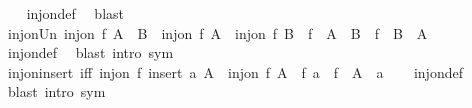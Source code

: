 \begin{isabellebody}
%
\isadelimproof
\ \ %
\endisadelimproof
%
\isatagproof
{}\isamarkupfalse%
\ inj{\isacharunderscore}{\kern0pt}on{\isacharunderscore}{\kern0pt}def\ \isamarkupfalse%
\ blast%
\endisatagproof
{\isafoldproof}%
%
\isadelimproof
\isanewline
%
\endisadelimproof
\isanewline
{}\isamarkupfalse%
\ inj{\isacharunderscore}{\kern0pt}on{\isacharunderscore}{\kern0pt}Un{\isacharcolon}{\kern0pt}\ {\isachardoublequoteopen}inj{\isacharunderscore}{\kern0pt}on\ f\ {\isacharparenleft}{\kern0pt}A\ {\isasymunion}\ B{\isacharparenright}{\kern0pt}\ {\isasymlongleftrightarrow}\ inj{\isacharunderscore}{\kern0pt}on\ f\ A\ {\isasymand}\ inj{\isacharunderscore}{\kern0pt}on\ f\ B\ {\isasymand}\ f\ {\isacharbackquote}{\kern0pt}\ {\isacharparenleft}{\kern0pt}A\ {\isacharminus}{\kern0pt}\ B{\isacharparenright}{\kern0pt}\ {\isasyminter}\ f\ {\isacharbackquote}{\kern0pt}\ {\isacharparenleft}{\kern0pt}B\ {\isacharminus}{\kern0pt}\ A{\isacharparenright}{\kern0pt}\ {\isacharequal}{\kern0pt}\ {\isacharbraceleft}{\kern0pt}{\isacharbraceright}{\kern0pt}{\isachardoublequoteclose}\isanewline
%
\isadelimproof
\ \ %
\endisadelimproof
%
\isatagproof
{}\isamarkupfalse%
\ inj{\isacharunderscore}{\kern0pt}on{\isacharunderscore}{\kern0pt}def\ \isamarkupfalse%
\ {\isacharparenleft}{\kern0pt}blast\ intro{\isacharcolon}{\kern0pt}\ sym{\isacharparenright}{\kern0pt}%
\endisatagproof
{\isafoldproof}%
%
\isadelimproof
\isanewline
%
\endisadelimproof
\isanewline
{}\isamarkupfalse%
\ inj{\isacharunderscore}{\kern0pt}on{\isacharunderscore}{\kern0pt}insert\ {\isacharbrackleft}{\kern0pt}iff{\isacharbrackright}{\kern0pt}{\isacharcolon}{\kern0pt}\ {\isachardoublequoteopen}inj{\isacharunderscore}{\kern0pt}on\ f\ {\isacharparenleft}{\kern0pt}insert\ a\ A{\isacharparenright}{\kern0pt}\ {\isasymlongleftrightarrow}\ inj{\isacharunderscore}{\kern0pt}on\ f\ A\ {\isasymand}\ f\ a\ {\isasymnotin}\ f\ {\isacharbackquote}{\kern0pt}\ {\isacharparenleft}{\kern0pt}A\ {\isacharminus}{\kern0pt}\ {\isacharbraceleft}{\kern0pt}a{\isacharbraceright}{\kern0pt}{\isacharparenright}{\kern0pt}{\isachardoublequoteclose}\isanewline
%
\isadelimproof
\ \ %
\endisadelimproof
%
\isatagproof
{}\isamarkupfalse%
\ inj{\isacharunderscore}{\kern0pt}on{\isacharunderscore}{\kern0pt}def\ \isamarkupfalse%
\ {\isacharparenleft}{\kern0pt}blast\ intro{\isacharcolon}{\kern0pt}\ sym{\isacharparenright}{\kern0pt}%
\endisatagproof
{\isafoldproof}%
%
\isadelimproof
\isanewline
%
\endisadelimproof
\isanewline
{}\isamarkupfalse%

\end{isabellebody}
